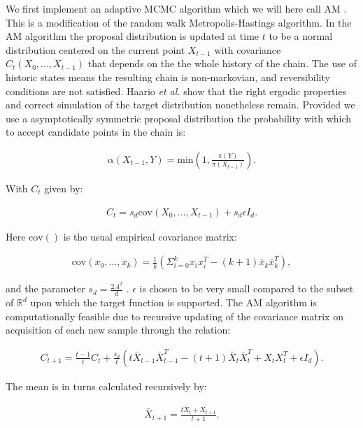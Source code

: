 \documentclass{article}
\begin{document}
We first implement an adaptive MCMC algorithm which we will here call AM \citep{haario2001}. This is a modification of the random walk Metropolis-Hastings algorithm. In the AM algorithm the proposal distribution is updated at time $t$ to be a normal distribution centered on the current point $X_{t-1}$ with covariance $C_t(X_0, ..., X_{t-1})$ that depends on the the whole history of the chain. The use of historic states means the resulting chain is non-markovian, and reversibility conditions are not satisfied. Haario \emph{et al.} show that the right ergodic properties and correct simulation of the target distribution nonetheless remain. Provided we use a asymptotically symmetric proposal distribution the probability with which to accept candidate points in the chain is:


\begin{align}
\alpha(X_{t-1},Y) = \text{min}\left( 1,\frac{\pi(Y)}{\pi(X_{t-1})}\right).
\end{align}

With $C_t$ given by:

\begin{align}
C_t = s_d \text{cov}(X_0, ..., X_{t-1}) + s_d\epsilon I_d.
\end{align}

Here $\text{cov}()$ is the usual empirical covariance matrix:

\begin{align}
\text{cov}(x_0,...,x_k)=\frac{1}{k} \left( \Sigma_{i=0}^{k}x_ix_i^T-(k+1)\bar{x}_k\bar{x}_k^T \right),
\end{align}

and the parameter $s_d = \frac{2.4^2}{d}$ \citep{gelman1996}. $\epsilon$ is chosen to be very small compared to the subset of $\mathbb{R}^d$ upon which the target function is supported. The AM algorithm is computationally feasible due to recursive updating of the covariance matrix on acquisition of each new sample through the relation:

\begin{align}
C_{t+1} = \frac{t-1}{t} C_t + \frac{s_d}{t}(t \bar{X}_{t-1}\bar{X}^T_{t-1} - (t+1)\bar{X}_t \bar{X}^T_t + X_tX_t^T + \epsilon I_d).
\end{align}

The mean is in turns calculated recursively by:

\begin{align}
\bar{X}_{t+1} = \frac{t \bar{X}_{t}  + X_{t+1}}{t+1}.
\end{align}
\end{document}
